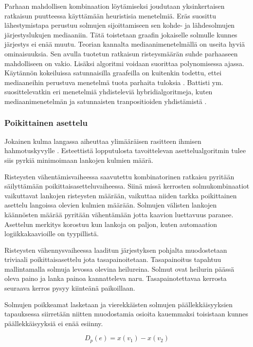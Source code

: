 \documentclass[finnish,12pt]{article}
\begin{document}
Parhaan mahdollisen kombinaation löytämiseksi joudutaan yksinkertaisen ratkaisun puutteessa käyttämään heuristisia menetelmiä.
Eräs suosittu lähestymistapa perustuu solmujen sijoittamiseen sen kohde- ja lähdesolmujen järjestyslukujen mediaaniin.
Tätä toistetaan graafin jokaiselle solmulle kunnes järjestys ei enää muutu.
Teorian kannalta mediaanimenetelmällä on useita hyviä ominaisuuksia.
Sen avulla tuotetun ratkaisun risteysmäärän suhde parhaaseen mahdolliseen on vakio.
Lisäksi algoritmi voidaan suorittaa polynomisessa ajassa.
Käytännön kokeiluissa satunnaisilla graafeilla on kuitenkin todettu, ettei mediaaneihin perustuva menetelmä tuota parhaita tuloksia \cite{RefWorks:52}. 
Battisti ym. suosittelevatkin eri menetelmiä yhdisteleviä hybridialgoritmeja, kuten mediaanimenetelmän ja satunnaisten tranpositioiden yhdistämistä \cite{RefWorks:39}.

				\subsubsection{Poikittainen asettelu}
				
Jokainen kulma langassa aiheuttaa ylimääräisen rasitteen ihmisen hahmotuskyvylle \cite{RefWorks:47}. 
Esteettistä lopputulosta tavoittelevan asettelualgoritmin tulee siis pyrkiä minimoimaan lankojen kulmien määrä.

Risteysten vähentämisvaiheessa saavutettu kombinatorinen ratkaisu pyritään säilyttämään poikittaisasetteluvaiheessa.
Siinä missä kerrosten solmukombinaatiot vaikuttavat lankojen risteysten määrään, vaikuttaa niiden tarkka poikittainen asettelu langoissa olevien kulmien määrään.
Solmujen välisten lankojen käännösten määrää pyritään vähentämään jotta kaavion luettavuus paranee.
Asettelun merkitys korostuu kun lankoja on paljon, kuten automaation logiikkakaavioille on tyypillistä.

Risteysten vähennysvaiheessa laaditun järjestyksen pohjalta muodostetaan triviaali poikittaisasettelu jota tasapainoitetaan.
Tasapainoitus tapahtuu mallintamalla solmuja levossa olevina heilureina.
Solmut ovat heilurin päässä oleva paino ja lanka painoa kannatteleva naru.
Tasapainotettavaa kerrosta seuraava kerros pysyy kiinteänä paikoillaan.

Solmujen poikkeamat lasketaan ja vierekkäisten solmujen päällekkäisyyksien tapauksessa siirretään niitten muodostamia osioita kauemmaksi toisistaan kunnes päällekkäisyyksiä ei enää esiinny.

\begin{equation}
	D_p(e)=x(v_1)-x(v_2)
\end{equation}
\end{document}
